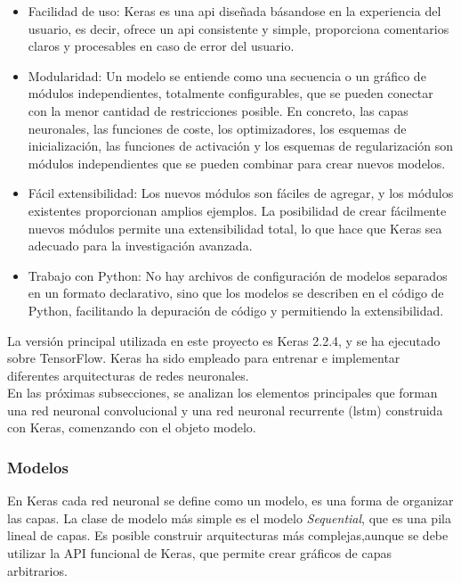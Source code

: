 \begin{itemize}
        \item Facilidad de uso: Keras es una \acrshort{api} diseñada básandose en la experiencia del usuario, es decir, ofrece un \acrshort{api} consistente y simple, proporciona comentarios claros y procesables en caso de error del usuario.
    
    \item Modularidad: Un modelo se entiende como una secuencia o un gráfico de módulos independientes, totalmente configurables, que se pueden conectar con la menor cantidad de restricciones posible. En concreto, las capas neuronales, las funciones de coste, los optimizadores, los esquemas de inicialización, las funciones de activación y los esquemas de regularización son módulos independientes que se pueden combinar para crear nuevos modelos.
    
    \item Fácil extensibilidad: Los nuevos módulos son fáciles de agregar, y los módulos existentes proporcionan amplios ejemplos. La posibilidad de crear fácilmente nuevos módulos permite una extensibilidad total, lo que hace que Keras sea adecuado para la investigación avanzada.
    
    \item Trabajo con Python: No hay archivos de configuración de modelos separados en un formato declarativo, sino que los modelos se describen en el código de Python, facilitando la depuración de código y permitiendo la extensibilidad.
\end{itemize}

La versión principal utilizada en este proyecto es Keras 2.2.4, y se ha ejecutado sobre TensorFlow. Keras ha sido empleado para entrenar e implementar diferentes arquitecturas de redes neuronales.\\

En las próximas subsecciones, se analizan los elementos principales que forman una red neuronal convolucional y una red neuronal recurrente (\acrshort{lstm}) construida con Keras, comenzando con el objeto modelo.


\subsubsection{Modelos}

En Keras cada red neuronal se define como un modelo, es una forma de organizar las capas. La clase de modelo más simple es el modelo \textit{Sequential}, que es una pila lineal de capas. Es posible construir arquitecturas más complejas,aunque se debe utilizar la API funcional de Keras, que permite crear gráficos de capas arbitrarios.\\

